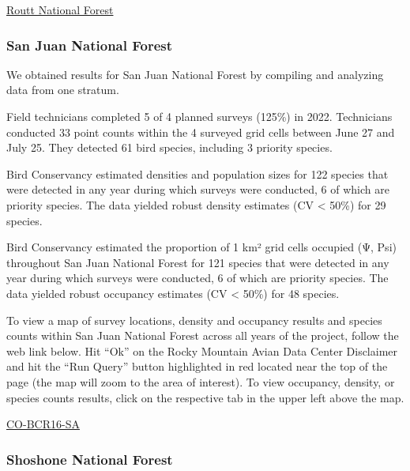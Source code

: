 \documentclass[
  letterpaper,
  DIV=11,
  numbers=noendperiod,
  oneside]{scrreprt}
\begin{document}
\href{http://www.rmbo.org/new_site/adc/QueryWindow.aspx\#N4IgzgrgDgpgTmALnAhoiBbEAuABCAJQHsJFFcA5NASyIDsUAbXAMSLhiRAF8g==}{Routt
National Forest}

\hypertarget{san-juan-national-forest}{%
\subsubsection{San Juan National
Forest}\label{san-juan-national-forest}}

We obtained results for San Juan National Forest by compiling and
analyzing data from one stratum.

Field technicians completed 5 of 4 planned surveys (125\%) in 2022.
Technicians conducted 33 point counts within the 4 surveyed grid cells
between June 27 and July 25. They detected 61 bird species, including 3
priority species.

Bird Conservancy estimated densities and population sizes for 122
species that were detected in any year during which surveys were
conducted, 6 of which are priority species. The data yielded robust
density estimates (CV \textless{} 50\%) for 29 species.

Bird Conservancy estimated the proportion of 1 km² grid cells occupied
(Ψ, Psi) throughout San Juan National Forest for 121 species that were
detected in any year during which surveys were conducted, 6 of which are
priority species. The data yielded robust occupancy estimates (CV
\textless{} 50\%) for 48 species.

To view a map of survey locations, density and occupancy results and
species counts within San Juan National Forest across all years of the
project, follow the web link below. Hit ``Ok'' on the Rocky Mountain
Avian Data Center Disclaimer and hit the ``Run Query'' button
highlighted in red located near the top of the page (the map will zoom
to the area of interest). To view occupancy, density, or species counts
results, click on the respective tab in the upper left above the map.

\href{http://www.rmbo.org/new_site/adc/QueryWindow.aspx\#N4IgzgLgTghhCuBbEAuABCAwgeQLQCFMAlARgDZcBlAQXUpgDs0ApeRtAOTgEsB7BmABs0AMV5QAppBABfIA}{CO-BCR16-SA}

\hypertarget{shoshone-national-forest}{%
\subsubsection{Shoshone National
Forest}\label{shoshone-national-forest}}
\end{document}
